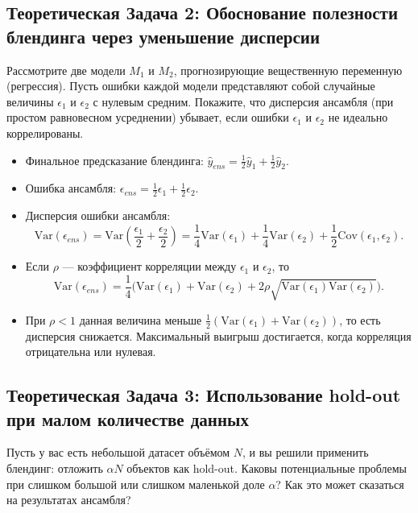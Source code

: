 \subsection{Теоретическая Задача 2: Обоснование полезности блендинга через уменьшение дисперсии}
Рассмотрите две модели $M_1$ и $M_2$, прогнозирующие вещественную переменную (регрессия). Пусть ошибки каждой модели представляют собой случайные величины $\epsilon_1$ и $\epsilon_2$ с нулевым средним. Покажите, что дисперсия ансамбля (при простом равновесном усреднении) убывает, если ошибки $\epsilon_1$ и $\epsilon_2$ не идеально коррелированы.

\begin{itemize}
    \item Финальное предсказание блендинга: $\hat{y}_{ens} = \frac{1}{2}\hat{y}_1 + \frac{1}{2}\hat{y}_2$.
    \item Ошибка ансамбля: $\epsilon_{ens} = \frac{1}{2}\epsilon_1 + \frac{1}{2}\epsilon_2$.
    \item Дисперсия ошибки ансамбля: 
    \[
    \mathrm{Var}(\epsilon_{ens}) = \mathrm{Var}\left(\frac{\epsilon_1}{2} + \frac{\epsilon_2}{2}\right) = \frac{1}{4}\mathrm{Var}(\epsilon_1) + \frac{1}{4}\mathrm{Var}(\epsilon_2) + \frac{1}{2}\mathrm{Cov}(\epsilon_1,\epsilon_2).
    \]
    \item Если $\rho$ --- коэффициент корреляции между $\epsilon_1$ и $\epsilon_2$, то
    \[
    \mathrm{Var}(\epsilon_{ens}) = \frac{1}{4}\bigl(\mathrm{Var}(\epsilon_1) + \mathrm{Var}(\epsilon_2) + 2\rho\sqrt{\mathrm{Var}(\epsilon_1)\mathrm{Var}(\epsilon_2)}\bigr).
    \]
    \item При $\rho<1$ данная величина меньше $\frac{1}{2}(\mathrm{Var}(\epsilon_1) + \mathrm{Var}(\epsilon_2))$, то есть дисперсия снижается. Максимальный выигрыш достигается, когда корреляция отрицательна или нулевая.
\end{itemize}

\subsection{Теоретическая Задача 3: Использование hold-out при малом количестве данных}
Пусть у вас есть небольшой датасет объёмом $N$, и вы решили применить блендинг: отложить $\alpha N$ объектов как hold-out. Каковы потенциальные проблемы при слишком большой или слишком маленькой доле $\alpha$? Как это может сказаться на результатах ансамбля?

